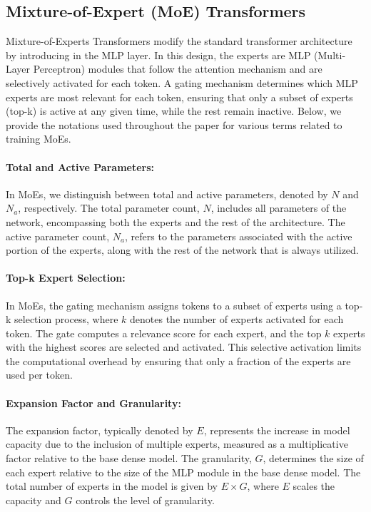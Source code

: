 \subsection{Mixture-of-Expert (MoE) Transformers} 

Mixture-of-Experts Transformers modify the standard transformer architecture by introducing in the MLP layer. In this design, the experts are MLP (Multi-Layer Perceptron) modules that follow the attention mechanism and are selectively activated for each token. A gating mechanism determines which MLP experts are most relevant for each token, ensuring that only a subset of experts (top-k) is active at any given time, while the rest remain inactive. Below, we provide the notations used throughout the paper for various terms related to training MoEs.

\paragraph{Total and Active Parameters:} In MoEs, we distinguish between total and active parameters, denoted by \(N\) and \(N_a\), respectively. The total parameter count, \(N\), includes all parameters of the network, encompassing both the experts and the rest of the architecture. The active parameter count, \(N_a\), refers to the parameters associated with the active portion of the experts, along with the rest of the network that is always utilized.

\paragraph{Top-k Expert Selection:} In MoEs, the gating mechanism assigns tokens to a subset of experts using a top-k selection process, where \(k\) denotes the number of experts activated for each token. The gate computes a relevance score for each expert, and the top \(k\) experts with the highest scores are selected and activated. This selective activation limits the computational overhead by ensuring that only a fraction of the experts are used per token.

\paragraph{Expansion Factor and Granularity:} The expansion factor, typically denoted by \(E\), represents the increase in model capacity due to the inclusion of multiple experts, measured as a multiplicative factor relative to the base dense model. The granularity, \(G\), determines the size of each expert relative to the size of the MLP module in the base dense model. The total number of experts in the model is given by \(E \times G\), where \(E\) scales the capacity and \(G\) controls the level of granularity.


